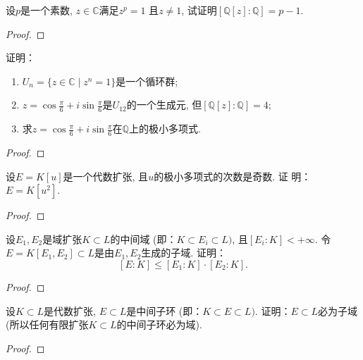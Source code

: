 \begin{problem}
    设$p$是一个素数, $z \in \mathbb{C}$满足$z^p = 1$
且$z \neq 1$, 试证明$[\mathbb{Q}[z]:\mathbb{Q}] = p - 1$.
\end{problem}

\begin{proof}
    
\end{proof}

\begin{problem}
    证明：
\begin{enumerate}[(1)]
    \item $U_n = \{z \in \mathbb{C} \mid z^n = 1\}$是一个循环群;
    \item $z = \cos \frac\pi6 + i\sin \frac\pi6$是$U_{12}$的一个生成元,
但$[\mathbb{Q}[z]:\mathbb{Q}] = 4$;
    \item 求$z = \cos \frac\pi6 + i\sin \frac\pi6$在$\mathbb{Q}$上的极小多项式.
\end{enumerate}
\end{problem}

\begin{proof}
    
\end{proof}

\begin{problem}
    设$E = K[u]$是一个代数扩张, 且$u$的极小多项式的次数是奇数. 证
明：$E = K[u^2]$.
\end{problem}

\begin{proof}
    
\end{proof}

\begin{problem}
    设$E_1, E_2$是域扩张$K \subset L$的中间域
(即：$K \subset E_i \subset L)$, 且$[E_i:K] < +\infty$.
令$E = K[E_1,E_2] \subset L$是由$E_1, E_2$生成的子域.
证明：
\[
    [E:K] \leqslant [E_1:K] \cdot [E_2:K].
\]
\end{problem}

\begin{proof}
    
\end{proof}

\begin{problem}
    设$K \subset L$是代数扩张, $E \subset L$是中间子环
(即：$K \subset E \subset L)$. 证明：$E\subset L$必为子域
(所以任何有限扩张$K \subset L$的中间子环必为域).
\end{problem}

\begin{proof}
    
\end{proof}


